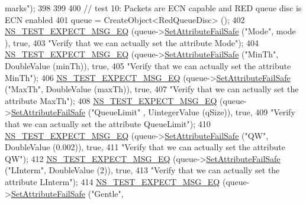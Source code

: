 \begin{DoxyCode}
{       marks"});
398 
399 
400   \textcolor{comment}{// test 10: Packets are ECN capable and RED queue disc is ECN enabled}
401   queue = CreateObject<RedQueueDisc> ();
402   \hyperlink{group__testing_ga7304ba46a28d8cf08dfdfd6499cf7068}{NS\_TEST\_EXPECT\_MSG\_EQ} (queue->\hyperlink{classns3_1_1ObjectBase_aa7d333004e970f925a4ed5df275541b5}{SetAttributeFailSafe} (\textcolor{stringliteral}{"Mode"}, mode
      ), \textcolor{keyword}{true},
403                          \textcolor{stringliteral}{"Verify that we can actually set the attribute Mode"});
404   \hyperlink{group__testing_ga7304ba46a28d8cf08dfdfd6499cf7068}{NS\_TEST\_EXPECT\_MSG\_EQ} (queue->\hyperlink{classns3_1_1ObjectBase_aa7d333004e970f925a4ed5df275541b5}{SetAttributeFailSafe} (\textcolor{stringliteral}{"MinTh"}, 
      DoubleValue (minTh)), \textcolor{keyword}{true},
405                          \textcolor{stringliteral}{"Verify that we can actually set the attribute MinTh"});
406   \hyperlink{group__testing_ga7304ba46a28d8cf08dfdfd6499cf7068}{NS\_TEST\_EXPECT\_MSG\_EQ} (queue->\hyperlink{classns3_1_1ObjectBase_aa7d333004e970f925a4ed5df275541b5}{SetAttributeFailSafe} (\textcolor{stringliteral}{"MaxTh"}, 
      DoubleValue (maxTh)), \textcolor{keyword}{true},
407                          \textcolor{stringliteral}{"Verify that we can actually set the attribute MaxTh"});
408   \hyperlink{group__testing_ga7304ba46a28d8cf08dfdfd6499cf7068}{NS\_TEST\_EXPECT\_MSG\_EQ} (queue->\hyperlink{classns3_1_1ObjectBase_aa7d333004e970f925a4ed5df275541b5}{SetAttributeFailSafe} (\textcolor{stringliteral}{"QueueLimit"}
      , UintegerValue (qSize)), \textcolor{keyword}{true},
409                          \textcolor{stringliteral}{"Verify that we can actually set the attribute QueueLimit"});
410   \hyperlink{group__testing_ga7304ba46a28d8cf08dfdfd6499cf7068}{NS\_TEST\_EXPECT\_MSG\_EQ} (queue->\hyperlink{classns3_1_1ObjectBase_aa7d333004e970f925a4ed5df275541b5}{SetAttributeFailSafe} (\textcolor{stringliteral}{"QW"}, 
      DoubleValue (0.002)), \textcolor{keyword}{true},
411                          \textcolor{stringliteral}{"Verify that we can actually set the attribute QW"});
412   \hyperlink{group__testing_ga7304ba46a28d8cf08dfdfd6499cf7068}{NS\_TEST\_EXPECT\_MSG\_EQ} (queue->\hyperlink{classns3_1_1ObjectBase_aa7d333004e970f925a4ed5df275541b5}{SetAttributeFailSafe} (\textcolor{stringliteral}{"LInterm"}, 
      DoubleValue (2)), \textcolor{keyword}{true},
413                          \textcolor{stringliteral}{"Verify that we can actually set the attribute LInterm"});
414   \hyperlink{group__testing_ga7304ba46a28d8cf08dfdfd6499cf7068}{NS\_TEST\_EXPECT\_MSG\_EQ} (queue->\hyperlink{classns3_1_1ObjectBase_aa7d333004e970f925a4ed5df275541b5}{SetAttributeFailSafe} (\textcolor{stringliteral}{"Gentle"}, 

\end{DoxyCode}
